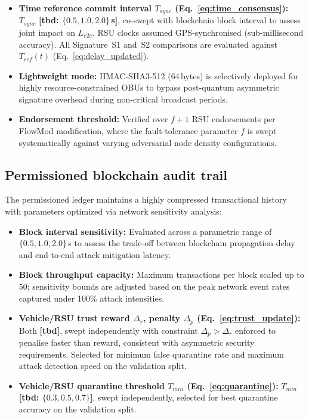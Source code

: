 \documentclass[12pt, a4paper]{report}
\begin{document}
{{\begin{itemize}
\item \textbf{Time reference commit interval
    $T_{sync}$ (Eq.~\ref{eq:time_consensus}):}
    $T_{sync}$ \textbf{[tbd:
    $\{0.5, 1.0, 2.0\}$\,s]}, co-swept with
    blockchain block interval to assess joint
    impact on $L_{e2e}$. RSU clocks assumed
    GPS-synchronised (sub-millisecond accuracy).
    All Signature~S1 and~S2 comparisons are
    evaluated against $T_{ref}(t)$
    (Eq.~\ref{eq:delay_updated}).

    \item \textbf{Lightweight mode:} HMAC-SHA3-512 ($64$\,bytes) is selectively deployed for highly resource-constrained OBUs to bypass post-quantum asymmetric signature overhead during non-critical broadcast periods.
    \item \textbf{Endorsement threshold:} Verified over $f+1$ RSU endorsements per FlowMod modification, where the fault-tolerance parameter $f$ is swept systematically against varying adversarial node density configurations.
\end{itemize}

\subsection{Permissioned blockchain audit trail}
The permissioned ledger maintains a highly compressed transactional history with parameters optimized via network sensitivity analysis:

\begin{itemize}
    \item \textbf{Block interval sensitivity:} Evaluated across a parametric range of $\{0.5, 1.0, 2.0\}$\,s to assess the trade-off between blockchain propagation delay and end-to-end attack mitigation latency.
    \item \textbf{Block throughput capacity:} Maximum transactions per block scaled up to 50; sensitivity bounds are adjusted based on the peak network event rates captured under 100\% attack intensities.
    
    \item \textbf{Vehicle/RSU trust reward $\Delta_r$,
    penalty $\Delta_p$
    (Eq.~\ref{eq:trust_update}):}
    Both \textbf{[tbd]}, swept independently with
    constraint $\Delta_p > \Delta_r$ enforced to
    penalise faster than reward, consistent with
    asymmetric security requirements. Selected for
    minimum false quarantine rate and maximum
    attack detection speed on the validation split.

    \item \textbf{Vehicle/RSU quarantine threshold
    $T_{min}$ (Eq.~\ref{eq:quarantine}):}
    $T_{min}$ \textbf{[tbd: $\{0.3, 0.5, 0.7\}$]},
    swept independently, selected for best
    quarantine accuracy on the validation split.




\end{itemize}}}
\end{document}
